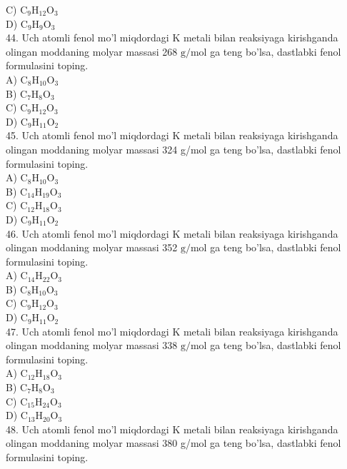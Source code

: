 C) $\mathrm{C}_{9} \mathrm{H}_{12} \mathrm{O}_{3}$\\
D) $\mathrm{C}_{9} \mathrm{H}_{9} \mathrm{O}_{3}$\\
44. Uch atomli fenol mo'l miqdordagi K metali bilan reaksiyaga kirishganda olingan moddaning molyar massasi 268 $\mathrm{g} / \mathrm{mol}$ ga teng bo'lsa, dastlabki fenol formulasini toping.\\
A) $\mathrm{C}_{8} \mathrm{H}_{10} \mathrm{O}_{3}$\\
B) $\mathrm{C}_{7} \mathrm{H}_{8} \mathrm{O}_{3}$\\
C) $\mathrm{C}_{9} \mathrm{H}_{12} \mathrm{O}_{3}$\\
D) $\mathrm{C}_{9} \mathrm{H}_{11} \mathrm{O}_{2}$\\
45. Uch atomli fenol mo'l miqdordagi K metali bilan reaksiyaga kirishganda olingan moddaning molyar massasi 324 g/mol ga teng bo'lsa, dastlabki fenol formulasini toping.\\
A) $\mathrm{C}_{8} \mathrm{H}_{10} \mathrm{O}_{3}$\\
B) $\mathrm{C}_{14} \mathrm{H}_{19} \mathrm{O}_{3}$\\
C) $\mathrm{C}_{12} \mathrm{H}_{18} \mathrm{O}_{3}$\\
D) $\mathrm{C}_{9} \mathrm{H}_{11} \mathrm{O}_{2}$\\
46. Uch atomli fenol mo'l miqdordagi K metali bilan reaksiyaga kirishganda olingan moddaning molyar massasi 352 $\mathrm{g} / \mathrm{mol}$ ga teng bo'lsa, dastlabki fenol formulasini toping.\\
A) $\mathrm{C}_{14} \mathrm{H}_{22} \mathrm{O}_{3}$\\
B) $\mathrm{C}_{8} \mathrm{H}_{10} \mathrm{O}_{3}$\\
C) $\mathrm{C}_{9} \mathrm{H}_{12} \mathrm{O}_{3}$\\
D) $\mathrm{C}_{9} \mathrm{H}_{11} \mathrm{O}_{2}$\\
47. Uch atomli fenol mo'l miqdordagi K metali bilan reaksiyaga kirishganda olingan moddaning molyar massasi 338 $\mathrm{g} / \mathrm{mol}$ ga teng bo'lsa, dastlabki fenol formulasini toping.\\
A) $\mathrm{C}_{12} \mathrm{H}_{18} \mathrm{O}_{3}$\\
B) $\mathrm{C}_{7} \mathrm{H}_{8} \mathrm{O}_{3}$\\
C) $\mathrm{C}_{15} \mathrm{H}_{24} \mathrm{O}_{3}$\\
D) $\mathrm{C}_{13} \mathrm{H}_{20} \mathrm{O}_{3}$\\
48. Uch atomli fenol mo'l miqdordagi K metali bilan reaksiyaga kirishganda olingan moddaning molyar massasi 380 g/mol ga teng bo'lsa, dastlabki fenol formulasini toping.\\
